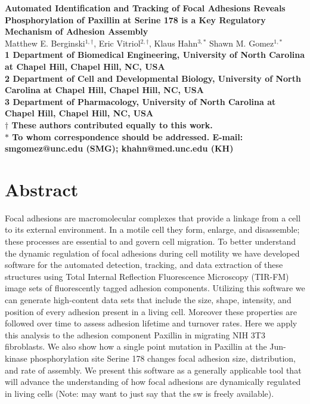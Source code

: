 \documentclass[10pt]{article}
\date{}
\begin{document}
\begin{flushleft}
{\Large
\textbf{Automated Identification and Tracking of Focal Adhesions Reveals Phosphorylation of Paxillin at Serine 178 is a Key Regulatory Mechanism of Adhesion Assembly}
}
\\
Matthew E. Berginski$^{1,\dagger}$, 
Eric Vitriol$^{2,\dagger}$, 
Klaus Hahn$^{3,\ast}$
Shawn M. Gomez$^{1,\ast}$
\\
\bf{1} Department of Biomedical Engineering, University of North Carolina at Chapel Hill, Chapel Hill, NC, USA
\\
\bf{2} Department of Cell and Developmental Biology, University of North Carolina at Chapel Hill, Chapel Hill, NC, USA
\\
\bf{3} Department of Pharmacology, University of North Carolina at Chapel Hill, Chapel Hill, NC, USA
\\
$\dagger$ These authors contributed equally to this work.
\\
$\ast$ To whom correspondence should be addressed. E-mail: smgomez@unc.edu (SMG); khahn@med.unc.edu (KH)
\end{flushleft}

\section*{Abstract}

Focal adhesions are macromolecular complexes that provide a linkage from a cell
to its external environment. In a motile cell they form, enlarge, and
disassemble; these processes are essential to and govern cell migration. To
better understand the dynamic regulation of focal adhesions during cell motility
we have developed software for the automated detection, tracking, and data
extraction of these structures using Total Internal Reflection Fluorescence
Microscopy (TIR-FM) image sets of fluorescently tagged adhesion components.
Utilizing this software we can generate high-content data sets that include the size, shape,
intensity, and position of every adhesion present in a living cell. Moreover these properties are followed over time to assess adhesion lifetime and
turnover rates. Here we apply this analysis to the adhesion component Paxillin in migrating NIH 3T3 fibroblasts. We also show how a single point mutation
in Paxillin at the Jun-kinase phosphorylation site Serine 178 changes focal
adhesion size, distribution, and rate of assembly. We present this  software as a
generally applicable tool that will advance the understanding of how focal
adhesions are dynamically regulated in living cells (Note: may want to just say
that the sw is freely available).
\end{document}
